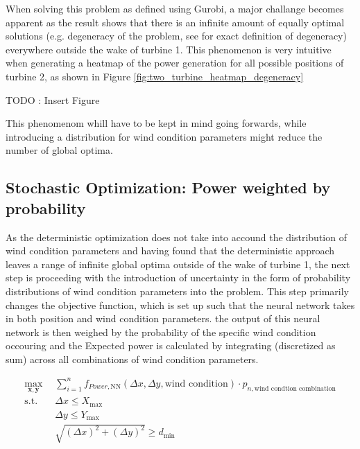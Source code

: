 When solving this problem as defined using Gurobi, a major challange becomes apparent as the result shows that there is an infinite amount of equally optimal solutions (e.g. degeneracy of the problem, see  \cite{vanderbei2020chapter3} for exact definition of degeneracy) everywhere outside the wake of turbine 1. This phenomenon is very intuitive when generating a heatmap of the power generation for all possible positions of turbine 2, as shown in Figure \ref{fig:two_turbine_heatmap_degeneracy}

TODO :  Insert Figure


This phenomenom whill have to be kept in mind going forwards, while introducing a distribution for wind condition parameters might reduce the number of global optima. 


\subsection{Stochastic Optimization:  Power weighted by probability}

As the deterministic optimization does not take into accound the distribution of wind condition parameters and having found that the deterministic approach leaves a range of infinite global optima outside of the wake of turbine 1, the next step is proceeding with the introduction of uncertainty in the form of probability distributions of wind condition parameters into the problem. This step primarily changes the objective function, which is set up such that the neural network takes in both position and wind condition parameters. the output of this neural network is then weighed by the probability of the specific wind condition occouring and the Expected power is calculated by integrating (discretized as sum) across all combinations of wind condition parameters.

\begin{align}
	\max_{\mathbf{x}, \mathbf{y}} &  \sum_{i=1}^{n} f_{Power,\text{NN}}(\Delta x, \Delta y, \text{wind condition})\cdot p_{n,\text{wind condtion combination}} \\
	\text{s.t.} \quad 
	&  \Delta x \leq X_{\max} \\
	&  \Delta y \leq Y_{\max} \\
	& \sqrt{(\Delta x)^2 + (\Delta y)^2} \geq d_{\min}
\end{align}

